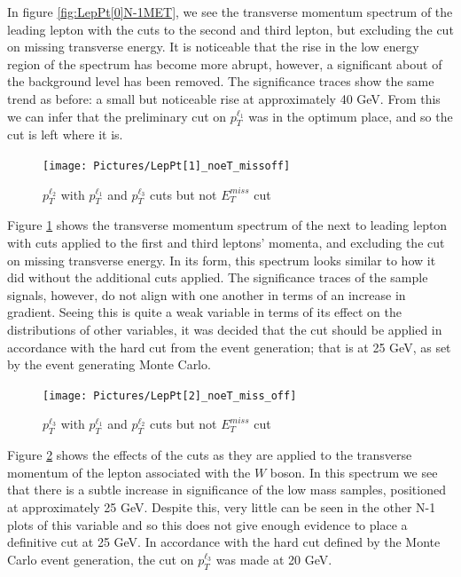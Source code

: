 In figure \ref{fig:LepPt[0]N-1MET}, we see the transverse momentum spectrum of the leading lepton with the cuts to the second and third lepton, but excluding the cut on missing transverse energy.
It is noticeable that the rise in the low energy region of the spectrum has become more abrupt, however, a significant about of the background level has been removed. 
The significance traces show the same trend as before: a small but noticeable rise at approximately 40 GeV.
From this we can infer that the preliminary cut on $p_{T}^{\ell_{1}}$ was in the optimum place, and so the cut is left where it is. 

\begin{figure}[H] %
   \centering
   \texttt{[image: Pictures/LepPt[1]\_noeT\_missoff]} 
   \caption{$p_{T}^{\ell_{2}}$ with $p_{T}^{\ell_{1}}$ and $p_{T}^{\ell_{3}}$ cuts but not $E_{T}^{miss}$ cut}
   \label{fig:LepPt[1]N-1MET}
\end{figure}

Figure \ref{fig:LepPt[1]N-1MET} shows the transverse momentum spectrum of the next to leading lepton with cuts applied to the first and third leptons' momenta, and excluding the cut on missing transverse energy.
In its form, this spectrum looks similar to how it did without the additional cuts applied.
The significance traces of the sample signals, however, do not align with one another in terms of an increase in gradient.
Seeing this is quite a weak variable in terms of its effect on the distributions of other variables, it was decided that the cut should be applied in accordance with the hard cut from the event generation; that is at 25 GeV, as set by the event generating Monte Carlo.

\begin{figure}[H] %
   \centering
   \texttt{[image: Pictures/LepPt[2]\_noeT\_miss\_off]} 
   \caption{$p_{T}^{\ell_{3}}$ with $p_{T}^{\ell_{1}}$ and $p_{T}^{\ell_{2}}$ cuts but not $E_{T}^{miss}$ cut}
   \label{fig:LepPt[2]N-1MET}
\end{figure}

Figure \ref{fig:LepPt[2]N-1MET} shows the effects of the cuts as they are applied to the transverse momentum of the lepton associated with the $W$ boson.
In this spectrum we see that there is a subtle increase in significance of the low mass samples, positioned at approximately 25 GeV.
Despite this, very little can be seen in the other N-1 plots of this variable and so this does not give enough evidence to place a definitive cut at 25 GeV.
In accordance with the hard cut defined by the Monte Carlo event generation, the cut on $p_{T}^{\ell_{3}}$ was made at 20 GeV. 

